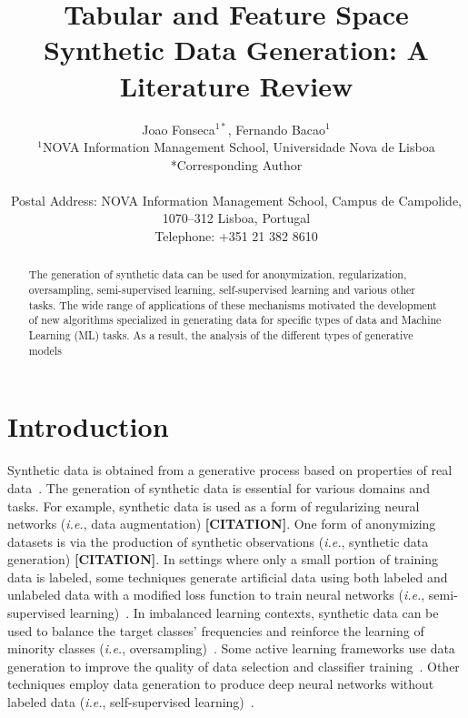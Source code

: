 \documentclass[parskip=full]{scrartcl}
\title{Tabular and Feature Space Synthetic Data Generation: A Literature Review}
\author{%
	Joao Fonseca\(^{1*}\), Fernando Bacao\(^{1}\)
	\\
	\small{\(^{1}\)NOVA Information Management School, Universidade Nova de Lisboa}
	\\
	\small{*Corresponding Author}
	\\
	\\
	\small{Postal Address: NOVA Information Management School, Campus de
    Campolide, 1070--312 Lisboa, Portugal}
	\\
	\small{Telephone: +351 21 382 8610}
}
\date{}
\begin{document}
\maketitle
\linenumbers

\begin{abstract}

    The generation of synthetic data can be used for anonymization,
    regularization, oversampling, semi-supervised learning, self-supervised
    learning and various other tasks. The wide range of applications of these
    mechanisms motivated the development of new algorithms specialized in
    generating data for specific types of data and Machine Learning (ML)
    tasks. As a result, the analysis of the different types of generative
    models 



\end{abstract}

\section{Introduction}\label{sec:introduction}

Synthetic data is obtained from a generative process based on properties of
real data~\cite{assefa2020generating}. The generation of synthetic data is
essential for various domains and tasks. For example, synthetic data is used
as a form of regularizing neural networks (\textit{i.e.}, data augmentation)
\textbf{[CITATION]}. One form of anonymizing datasets is via the production of
synthetic observations (\textit{i.e.}, synthetic data generation)
\textbf{[CITATION]}. In settings where only a small portion of training data
is labeled, some techniques generate artificial data using both labeled and
unlabeled data with a modified loss function to train neural networks
(\textit{i.e.}, semi-supervised learning)~\cite{laine2017temporal}. In
imbalanced learning contexts, synthetic data can be used to balance the target
classes' frequencies and reinforce the learning of minority classes
(\textit{i.e.}, oversampling)~\cite{fonseca2021improving}. Some active
learning frameworks use data generation to improve the quality of data
selection and classifier training~\cite{kim2021lada}. Other techniques employ
data generation to produce deep neural networks without labeled data
(\textit{i.e.}, self-supervised learning)~\cite{grill2020bootstrap}.
\end{document}
